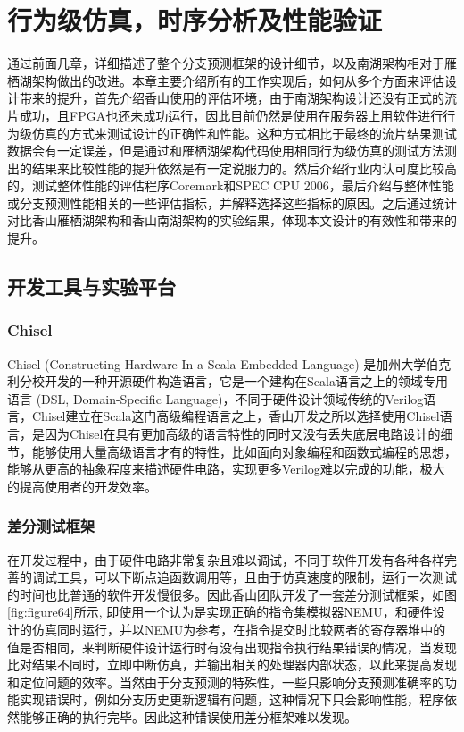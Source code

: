 \chapter{行为级仿真，时序分析及性能验证}

通过前面几章，详细描述了整个分支预测框架的设计细节，以及南湖架构相对于雁栖湖架构做出的改进。本章主要介绍所有的工作实现后，如何从多个方面来评估设计带来的提升，首先介绍香山使用的评估环境，由于南湖架构设计还没有正式的流片成功，且FPGA也还未成功运行，因此目前仍然是使用在服务器上用软件进行行为级仿真的方式来测试设计的正确性和性能。这种方式相比于最终的流片结果测试数据会有一定误差，但是通过和雁栖湖架构代码使用相同行为级仿真的测试方法测出的结果来比较性能的提升依然是有一定说服力的。然后介绍行业内认可度比较高的，测试整体性能的评估程序Coremark和SPEC CPU 2006，最后介绍与整体性能或分支预测性能相关的一些评估指标，并解释选择这些指标的原因。之后通过统计对比香山雁栖湖架构和香山南湖架构的实验结果，体现本文设计的有效性和带来的提升。

\section{开发工具与实验平台}

\subsection{Chisel}

Chisel (Constructing Hardware In a Scala Embedded Language) 是加州大学伯克利分校开发的一种开源硬件构造语言，它是一个建构在Scala语言\cite{scala}之上的领域专用语言 (DSL, Domain-Specific Language)，不同于硬件设计领域传统的Verilog语言，Chisel建立在Scala这门高级编程语言之上，香山开发之所以选择使用Chisel语言，是因为Chisel在具有更加高级的语言特性的同时又没有丢失底层电路设计的细节，能够使用大量高级语言才有的特性，比如面向对象编程和函数式编程的思想，能够从更高的抽象程度来描述硬件电路，实现更多Verilog难以完成的功能，极大的提高使用者的开发效率。

\subsection{差分测试框架}

在开发过程中，由于硬件电路非常复杂且难以调试，不同于软件开发有各种各样完善的调试工具，可以下断点追函数调用等，且由于仿真速度的限制，运行一次测试的时间也比普通的软件开发慢很多。因此香山团队开发了一套差分测试框架，如图\ref{fig:figure64}所示, 即使用一个认为是实现正确的指令集模拟器NEMU\cite{nemu}，和硬件设计的仿真同时运行，并以NEMU为参考，在指令提交时比较两者的寄存器堆中的值是否相同，来判断硬件设计运行时有没有出现指令执行结果错误的情况，当发现比对结果不同时，立即中断仿真，并输出相关的处理器内部状态，以此来提高发现和定位问题的效率。当然由于分支预测的特殊性，一些只影响分支预测准确率的功能实现错误时，例如分支历史更新逻辑有问题，这种情况下只会影响性能，程序依然能够正确的执行完毕。因此这种错误使用差分框架难以发现。

